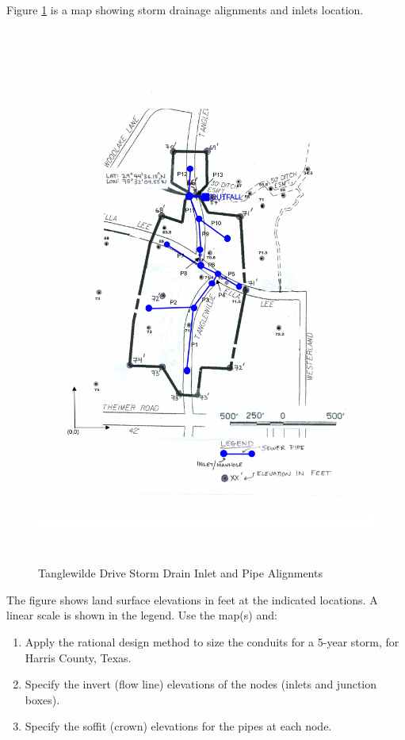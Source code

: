 \documentclass[12pt]{article}
\begin{document}
\begin{enumerate}
Figure \ref{fig:survey} is a map showing storm drainage alignments and inlets location.  
\begin{figure}[h!] %
   \centering
   \includegraphics[height=7in]{Image119B.jpg} 
   \caption{Tanglewilde Drive Storm Drain Inlet and Pipe Alignments}
   \label{fig:survey}
\end{figure}

The figure shows land surface elevations in feet at the indicated locations.  
A linear scale is shown in the legend.  
Use the map(s) and:

\begin{enumerate}
\item Apply the rational design method to size the conduits for a 5-year storm, for Harris County, Texas.
\item Specify the invert (flow line) elevations of the nodes (inlets and junction boxes).
\item Specify the soffit (crown) elevations for the pipes at each node.
\end{enumerate}


\end{enumerate}
\end{document}
